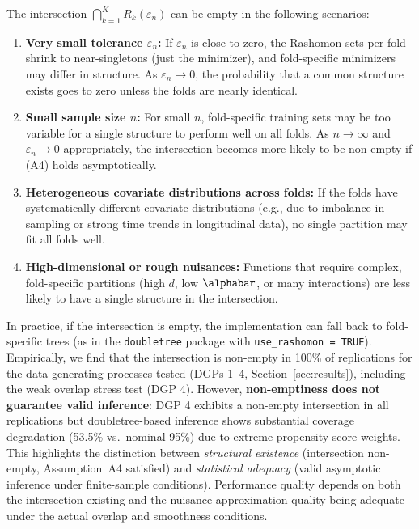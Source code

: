 \documentclass[12pt]{article}
\begin{document}
\begin{remark}
\label{rem:intersection-empty}
The intersection $\bigcap_{k=1}^K R_k(\varepsilon_n)$ can be empty in the following scenarios:
\begin{enumerate}
\item \textbf{Very small tolerance $\varepsilon_n$:} If $\varepsilon_n$ is close to zero, the Rashomon sets per fold shrink to near-singletons (just the minimizer), and fold-specific minimizers may differ in structure. As $\varepsilon_n \to 0$, the probability that a common structure exists goes to zero unless the folds are nearly identical.
\item \textbf{Small sample size $n$:} For small $n$, fold-specific training sets may be too variable for a single structure to perform well on all folds. As $n \to \infty$ and $\varepsilon_n \to 0$ appropriately, the intersection becomes more likely to be non-empty if (A4) holds asymptotically.
\item \textbf{Heterogeneous covariate distributions across folds:} If the folds have systematically different covariate distributions (e.g., due to imbalance in sampling or strong time trends in longitudinal data), no single partition may fit all folds well.
\item \textbf{High-dimensional or rough nuisances:} Functions that require complex, fold-specific partitions (high $d$, low $\alphabar$, or many interactions) are less likely to have a single structure in the intersection.
\end{enumerate}
In practice, if the intersection is empty, the implementation can fall back to fold-specific trees (as in the \texttt{doubletree} package with \texttt{use\_rashomon = TRUE}). Empirically, we find that the intersection is non-empty in 100\% of replications for the data-generating processes tested (DGPs 1--4, Section~\ref{sec:results}), including the weak overlap stress test (DGP 4). However, \textbf{non-emptiness does not guarantee valid inference}: DGP 4 exhibits a non-empty intersection in all replications but doubletree-based inference shows substantial coverage degradation (53.5\% vs.\ nominal 95\%) due to extreme propensity score weights. This highlights the distinction between \emph{structural existence} (intersection non-empty, Assumption~A4 satisfied) and \emph{statistical adequacy} (valid asymptotic inference under finite-sample conditions). Performance quality depends on both the intersection existing and the nuisance approximation quality being adequate under the actual overlap and smoothness conditions.
\end{remark}
\end{document}
